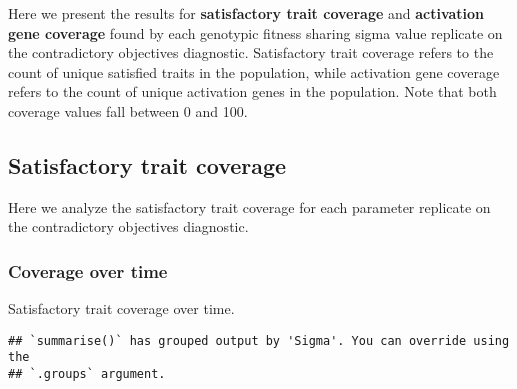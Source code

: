 \documentclass[]{book}
\newenvironment{Shaded}{\begin{snugshade}}{\end{snugshade}}
\newcommand{\DataTypeTok}[1]{\textcolor[rgb]{0.13,0.29,0.53}{#1}}
\newcommand{\KeywordTok}[1]{\textcolor[rgb]{0.13,0.29,0.53}{\textbf{#1}}}
\newcommand{\NormalTok}[1]{#1}
\newcommand{\OperatorTok}[1]{\textcolor[rgb]{0.81,0.36,0.00}{\textbf{#1}}}
\newcommand{\StringTok}[1]{\textcolor[rgb]{0.31,0.60,0.02}{#1}}
\begin{document}
Here we present the results for \textbf{satisfactory trait coverage} and \textbf{activation gene coverage} found by each genotypic fitness sharing sigma value replicate on the contradictory objectives diagnostic.
Satisfactory trait coverage refers to the count of unique satisfied traits in the population, while activation gene coverage refers to the count of unique activation genes in the population.
Note that both coverage values fall between 0 and 100.

\hypertarget{satisfactory-trait-coverage-4}{%
\subsection{Satisfactory trait coverage}\label{satisfactory-trait-coverage-4}}

Here we analyze the satisfactory trait coverage for each parameter replicate on the contradictory objectives diagnostic.

\hypertarget{coverage-over-time-14}{%
\subsubsection{Coverage over time}\label{coverage-over-time-14}}

Satisfactory trait coverage over time.

\begin{Shaded}
\end{Shaded}

\begin{verbatim}
## `summarise()` has grouped output by 'Sigma'. You can override using the
## `.groups` argument.
\end{verbatim}
\end{document}
